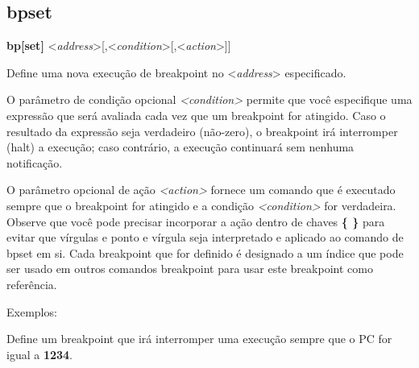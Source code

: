 \documentclass[letterpaper,10pt,brazil]{sphinxmanual}
\begin{document}
\subsection{bpset}
\label{debugger/breakpoint:debugger-command-bpset}\label{debugger/breakpoint:bpset}
\begin{DUlineblock}{0em}
\item[]
\begin{DUlineblock}{\DUlineblockindent}
\item[] \textbf{bp{[}set{]}} \textless{}\emph{address}\textgreater{}{[},\textless{}\emph{condition}\textgreater{}{[},\textless{}\emph{action}\textgreater{}{]}{]}
\item[] 
\end{DUlineblock}
\item[] Define uma nova execução de breakpoint no \textless{}\emph{address}\textgreater{} especificado.
\item[] O parâmetro de condição opcional \emph{\textless{}condition\textgreater{}} permite que você especifique uma expressão que será avaliada cada vez que um breakpoint for atingido. Caso o resultado da expressão seja verdadeiro (não-zero), o breakpoint irá interromper (halt) a execução; caso contrário, a execução continuará sem nenhuma notificação.
\item[] O parâmetro opcional de ação \emph{\textless{}action\textgreater{}} fornece um comando que é executado sempre que o breakpoint for atingido e a condição \emph{\textless{}condition\textgreater{}} for verdadeira. Observe que você pode precisar incorporar a ação dentro de chaves \textbf{\{ \}} para evitar que vírgulas e ponto e vírgula seja interpretado e aplicado ao comando de bpset em si. Cada breakpoint que for definido é designado a um índice que pode ser usado em outros comandos breakpoint para usar este breakpoint como referência.
\item[] 
\item[] Exemplos:
\item[] 
\item[]
\begin{DUlineblock}{\DUlineblockindent}
\item[] 
\item[] 
\end{DUlineblock}
\item[] Define um breakpoint que irá interromper uma execução sempre que o PC for igual a \textbf{1234}.
\item[] 
\item[]
\begin{DUlineblock}{\DUlineblockindent}

\end{DUlineblock}
\end{DUlineblock}
\end{document}

